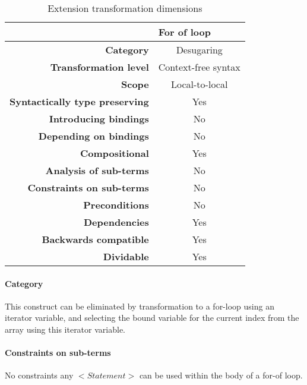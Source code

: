 \documentclass[10pt,a4paper]{article}
\begin{document}
\begin{table}[H]
\centering
\caption{Extension transformation dimensions}
\label{for-of-table}
\begin{tabular}{@{}rc@{}}
\toprule
                                       & \multicolumn{1}{l}{\textbf{For of loop}} \\ \midrule
\textbf{Category}                      & Desugaring
\\
\textbf{Transformation level}          & Context-free syntax                          \\
\textbf{Scope}                         & Local-to-local                               \\
\textbf{Syntactically type preserving} & Yes                                          \\
\textbf{Introducing bindings}          & No                                          \\%
\textbf{Depending on bindings}         & No                                           \\
\textbf{Compositional}                 & Yes                                          \\
\textbf{Analysis of sub-terms}          & No                                          \\
\textbf{Constraints on sub-terms}       & No                                           \\
\textbf{Preconditions}                 & No                                          \\
\textbf{Dependencies}                  & Yes                                           \\
\textbf{Backwards compatible}          & Yes                                          \\
\textbf{Dividable}                     & Yes                                           \\ \bottomrule
\end{tabular}
\end{table}

\paragraph{Category}
This construct can be eliminated by transformation to a for-loop using an iterator variable, and selecting the bound variable for the current index from the array using this iterator variable.

\paragraph{Constraints on sub-terms}
No constraints any $<Statement>$ can be used within the body of a for-of loop.
\end{document}
